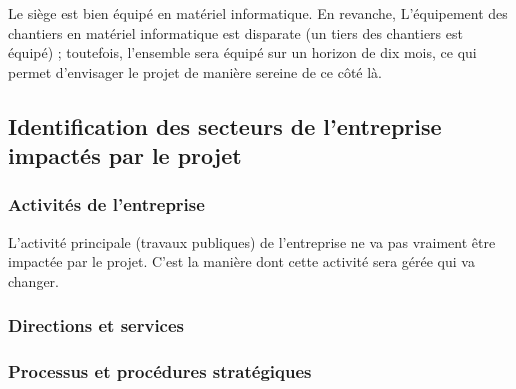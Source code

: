 \documentclass[12pt]{article}
\begin{document}
Le siège est bien équipé en matériel informatique. En revanche, 
L'équipement des chantiers en matériel informatique est disparate (un tiers
des chantiers est équipé) ; toutefois, l'ensemble sera équipé sur un horizon de
dix mois, ce qui permet d'envisager le projet de manière sereine de ce côté
là.


\subsection{Identification des secteurs de l'entreprise impactés par le projet}

\subsubsection{Activités de l'entreprise}

L'activité principale (travaux publiques) de l'entreprise ne va pas
vraiment être impactée par le projet. C'est la manière dont cette activité
sera gérée qui va changer.


\subsubsection{Directions et services}
\subsubsection{Processus et procédures stratégiques}
\end{document}
